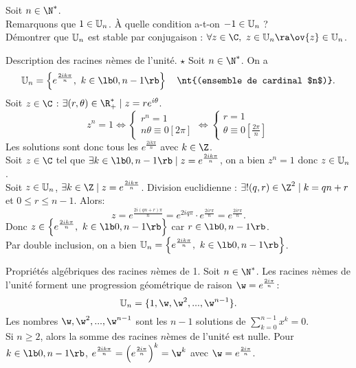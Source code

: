 \documentclass[11pt]{article}
\begin{document}
Soit $n\in\N^*$.\\
\quad Remarquons que $1\in\mathbb{U}_n$. À quelle condition a-t-on $-1\in\mathbb{U}_n$ ?\\
\quad Démontrer que $\mathbb{U}_n$ est stable par conjugaison : $\forall z\in \C,~ z\in\U_n\ra\ov{z}\in\U_n$.

\begin{thm}{Description des racines $n$èmes de l'unité. $\star$}{}
    Soit $n\in\N^*$. On a
    \begin{equation*}
        \U_n=\left\{e^{\frac{2ik\pi}{n}},~k\in\lb0,n-1\rb\right\} \quad \nt{(ensemble de cardinal $n$)}.
    \end{equation*}
    \tcblower
    Soit $z\in\C$ : $\exists (r,\theta)\in\R_+^* \mid z=re^{i\theta}$.
    \begin{equation*}
        z^n=1 \iff \begin{cases} r^n = 1 \\ n\theta \equiv 0[2\pi]\end{cases} \iff \begin{cases} r = 1 \\ \theta \equiv 0[\frac{2\pi}{n}]\end{cases}
    \end{equation*}
    Les solutions sont donc tous les $e^{\frac{2ik\pi}{n}}$ avec $k\in\Z$.\\
    \boxed{\supset} Soit $z\in\C$ tel que $\exists k\in\lb0,n-1\rb\mid z=e^\frac{2ik\pi}{n}$, on a bien $z^n=1$ donc $z\in\mathbb{U}_n$.\\
    \boxed{\subset} Soit $z\in\mathbb{U}_n$, $\exists k\in\Z\mid z=e^\frac{2ik\pi}{n}$. Division euclidienne : $\exists!(q,r)\in\Z^2\mid k=qn+r$ et $0\leq r \leq n-1$. Alors:
    \begin{equation*}
        z=e^{\frac{2i(qn+r)\pi}{n}}=e^{2iq\pi}\cdot e^{\frac{2ir\pi}{n}}=e^{\frac{2ir\pi}{n}}.
    \end{equation*}
    Donc $z\in\left\{ e^\frac{2ik\pi}{n}, ~ k\in\lb0,n-1\rb \right\}$ car $r\in\lb0,n-1\rb$.\\
    Par double inclusion, on a bien $\U_n=\left\{ e^\frac{2ik\pi}{n}, ~ k\in\lb0,n-1\rb \right\}$.
\end{thm}

\begin{prop}{Propriétés algébriques des racines $n$èmes de 1.}{}
    Soit $n\in\N^*$. Les racines $n$èmes de l'unité forment une progression géométrique de raison $\w=e^{\frac{2i\pi}{n}}$:
    \begin{equation*}
        \U_n=\{1,\w,\w^2,...,\w^{n-1}\}.
    \end{equation*}
    Les nombres $\w,\w^2,...,\w^{n-1}$ sont les $n-1$ solutions de $\sum\limits_{k=0}^{n-1}x^k=0$.\\
    Si $n\geq2$, alors la somme des racines $n$èmes de l'unité est nulle.
    \tcblower
    Pour $k\in\lb0,n-1\rb$, $e^{\frac{2ik\pi}{n}}=\left(e^{\frac{2i\pi}{n}}\right)^k=\w^k$ avec $\w=e^\frac{2i\pi}{n}$.
\end{prop}
\end{document}
